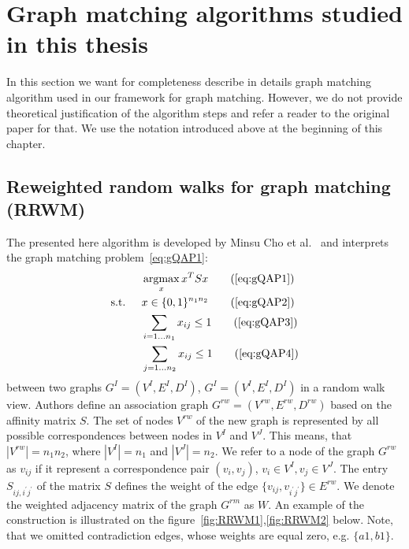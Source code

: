 \section{Graph matching algorithms studied in this thesis}
In this section we want for completeness describe in details graph matching algorithm used in our framework for graph matching. However, we do not provide theoretical justification of the algorithm steps and refer a reader to the original paper for that. We use the notation introduced above at the beginning of this chapter.

\subsection{Reweighted random walks for graph matching (RRWM)}
The presented here algorithm is developed by Minsu Cho et al.~\cite{Cho2010_RRWM} and interprets the graph matching problem~\eqref{eq:gQAP1}:
\begin{alignat*}{2}
    &     && \argmax_x{x^TSx}                           \tag{\ref{eq:gQAP1}}\\
    & \text{s.t. } &&  x\in \{0,1\}^{n_1n_2}            \tag{\ref{eq:gQAP2}}\\
    &             &&  \sum_{i=1\dots n_1} x_{ij}\le 1   \tag{\ref{eq:gQAP3}}\\
    &             &&  \sum_{j=1\dots n_2} x_{ij}\le 1   \tag{\ref{eq:gQAP4}}
\end{alignat*}
between two graphs $G^I=(V^I,E^I,D^I)$, $G^I=(V^I,E^I,D^I)$ in a random walk view. Authors define an association graph $G^{rw}=(V^{rw},E^{rw},D^{rw})$ based on the affinity matrix $S$. The set of nodes $V^{rw}$ of the new graph is represented by all possible correspondences between nodes in $V^I$ and $V^J$. This means, that $|V^{rw}|=n_1n_2$, where $|V^I|=n_1$ and $|V^J|=n_2$. We refer to a node of the graph $G^{rw}$ as $v_{ij}$ if it represent a correspondence pair $(v_i,v_j)$, $v_i\in V^I,v_j\in V^J$. The entry $S_{ij,i^\prime j^\prime}$ of the matrix $S$ defines the weight of the edge $\{v_{ij},v_{i^\prime j^\prime}\}\in E^{rw}$. We denote the weighted adjacency matrix of the graph $G^{rm}$ as $W$. An example of the construction is illustrated on the figure~\ref{fig:RRWM1},\ref{fig:RRWM2} below. Note, that we omitted contradiction edges, whose weights are equal zero, e.g. $\{a1,b1\}$.

